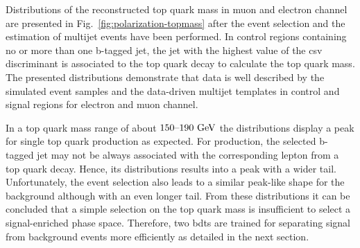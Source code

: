 
Distributions of the reconstructed top quark mass in muon and electron channel are presented in Fig.~\ref{fig:polarization-topmass} after the event selection and the estimation of multijet events have been performed. In control regions containing no or more than one b-tagged jet, the jet with the highest value of the \gls{csv} discriminant is associated to the top quark decay to calculate the top quark mass.  The presented distributions demonstrate that data is well described by the simulated event samples and the data-driven multijet templates in control and signal regions for electron and muon channel.

In a top quark mass range of about $150\text{--}190~\mathrm{GeV}$ the distributions display a peak for single top quark production as expected. For \ttbar production, the selected b-tagged jet may not be always associated with the corresponding lepton from a top quark decay. Hence, its distributions results into a peak with a wider tail. Unfortunately, the event selection also leads to a similar peak-like shape for the \wjets background although with an even longer tail. From these distributions it can be concluded that a simple selection on the top quark mass is insufficient to select a signal-enriched phase space. Therefore, two \glspl{bdt} are trained for separating signal from background events more efficiently as detailed in the next section.

